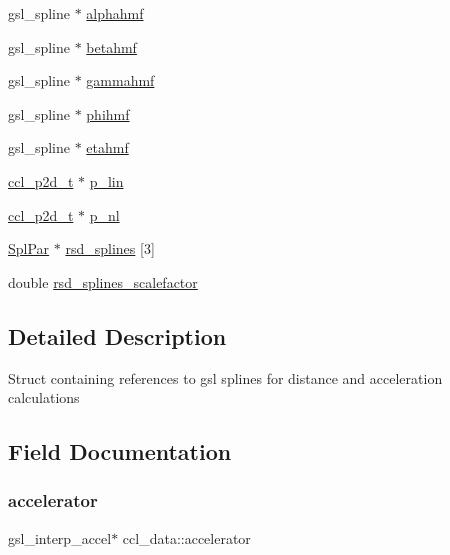 \begin{DoxyCompactItemize}
\item 
gsl\+\_\+spline $\ast$ \mbox{\hyperlink{structccl__data_ad7fad40bf36fed46f5879104247de00b}{alphahmf}}
\item 
gsl\+\_\+spline $\ast$ \mbox{\hyperlink{structccl__data_a7ce4d3fb195d2dd11674bcc7e5f96afe}{betahmf}}
\item 
gsl\+\_\+spline $\ast$ \mbox{\hyperlink{structccl__data_a2d1c80d82e2d5373ca8c142d09853842}{gammahmf}}
\item 
gsl\+\_\+spline $\ast$ \mbox{\hyperlink{structccl__data_a6417dfa54222033c8c229d3ca5e0866e}{phihmf}}
\item 
gsl\+\_\+spline $\ast$ \mbox{\hyperlink{structccl__data_a1dea641d6ae09c5e2ee8811a21c6ceda}{etahmf}}
\item 
\mbox{\hyperlink{structccl__p2d__t}{ccl\+\_\+p2d\+\_\+t}} $\ast$ \mbox{\hyperlink{structccl__data_aa2daa15d06d8739adae5a45be494c2c5}{p\+\_\+lin}}
\item 
\mbox{\hyperlink{structccl__p2d__t}{ccl\+\_\+p2d\+\_\+t}} $\ast$ \mbox{\hyperlink{structccl__data_ad5cbffe11bc08c851293f7b72b6a2f90}{p\+\_\+nl}}
\item 
\mbox{\hyperlink{struct_spl_par}{Spl\+Par}} $\ast$ \mbox{\hyperlink{structccl__data_ac655eaa75acfd755a45bb39e2344d800}{rsd\+\_\+splines}} \mbox{[}3\mbox{]}
\item 
double \mbox{\hyperlink{structccl__data_ad599220fa8b248458b36d48906b75d1d}{rsd\+\_\+splines\+\_\+scalefactor}}
\end{DoxyCompactItemize}


\subsection{Detailed Description}
Struct containing references to gsl splines for distance and acceleration calculations 

\subsection{Field Documentation}
\mbox{\label{structccl__data_ad8d2aef21dc9cf1fdee8e4afe3778b33}} 
\subsubsection{\texorpdfstring{accelerator}{accelerator}}
{\footnotesize\ttfamily gsl\+\_\+interp\+\_\+accel$\ast$ ccl\+\_\+data\+::accelerator}

